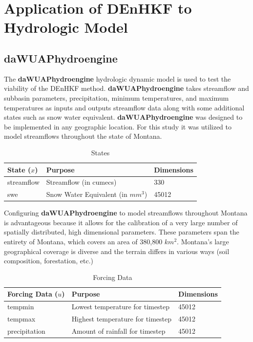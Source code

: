 \chapter{Application of DEnHKF to Hydrologic Model}

\section{daWUAPhydroengine}

The \textbf{daWUAPhydroengine} hydrologic dynamic model is used to test the viability of the DEnHKF method.  \textbf{daWUAPhydroengine} takes streamflow and subbasin parameters, precipitation, minimum temperatures, and maximum temperatures as inputs and outputs streamflow data along with some additional states such as snow water equivalent. \textbf{daWUAPhydroengine} was designed to be implemented in any geographic location. For this study it was utilized to model streamflows throughout the state of Montana.

\begin{table}[]
\caption{States} 
\begin{tabular}{lll}
State ($x$) & Purpose                              & Dimensions  \\ \hline
streamflow  & Streamflow (in cumecs)               & 330   \\
swe         & Snow Water Equivalent  (in $mm^{3}$) & 45012
\end{tabular}
\label{tab:states}
\end{table}

Configuring \textbf{daWUAPhydroengine} to model streamflows throughout Montana is advantageous because it allows for the calibration of a very large number of spatially distributed, high dimensional parameters. These parameters span the entirety of Montana, which covers an area of 380,800 $km^{2}$. Montana's large geographical coverage is diverse and the terrain differs in various ways (soil composition, forestation, etc.)

\begin{table}[]
\caption{Forcing Data} 
\begin{tabular}{lll}
Forcing Data ($u$) & Purpose                          & Dimensions \\ \hline
tempmin          & Lowest temperature for timestep  & 45012 \\
tempmax          & Highest temperature for timestep & 45012 \\
precipitation      & Amount of rainfall for timestep & 45012 
\end{tabular}
\label{tab:u_params}
\end{table}

